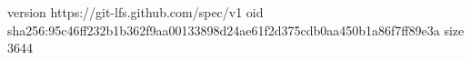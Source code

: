 version https://git-lfs.github.com/spec/v1
oid sha256:95c46ff232b1b362f9aa00133898d24ae61f2d375cdb0aa450b1a86f7ff89e3a
size 3644
